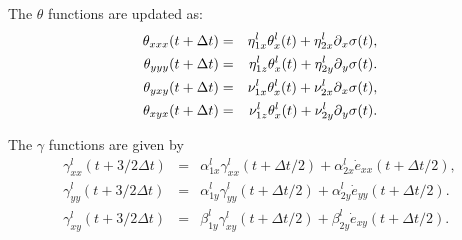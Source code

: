 \documentclass[11pt]{article}
\begin{document}
The $\theta$ functions are updated as:
\begin{eqnarray*}
   \theta_{xxx}(t+\Delta t)  
                         & = &\eta^l_{1x} \theta^l_{x}(t)
                        + \eta^l_{2x}\mbox{$\partial$}_x{\sigma}(t),\\
   \theta_{yyy}(t+\Delta t)  
                         & = &\eta^l_{1z} \theta^l_{x}(t)
                        + \eta^l_{2y}\mbox{$\partial$}_y{\sigma}(t). \\
   \theta_{yxy}(t+\Delta t)  
                         & = &\nu^l_{1x} \theta^l_{x}(t)
                        + \nu^l_{2x}\mbox{$\partial$}_x{\sigma}(t),\\
   \theta_{xyx}(t+\Delta t)  
                         & = &\nu^l_{1z} \theta^l_{x}(t)
                        + \nu^l_{2y}\mbox{$\partial$}_y{\sigma}(t).
\end{eqnarray*}

The $\gamma$ functions are given by
\begin{eqnarray*}
\gamma^l_{xx}(t+3/2\Delta t)  & = &\alpha^l_{1x} \gamma^l_{xx}(t+\Delta t/2) 
                        + \alpha^l_{2x}\dot{e}_{xx}(t+\Delta t/2), \\
\gamma^l_{yy}(t+3/2\Delta t)  & = &\alpha^l_{1y} \gamma^l_{yy}(t+\Delta t/2) 
                        + \alpha^l_{2y}\dot{e}_{yy}(t+\Delta t/2).   \\
\gamma^l_{xy}(t+3/2\Delta t)  & = &\beta^l_{1y} \gamma^l_{xy}(t+\Delta t/2) 
                        + \beta^l_{2y}\dot{e}_{xy}(t+\Delta t/2). 
\end{eqnarray*}
\end{document}
